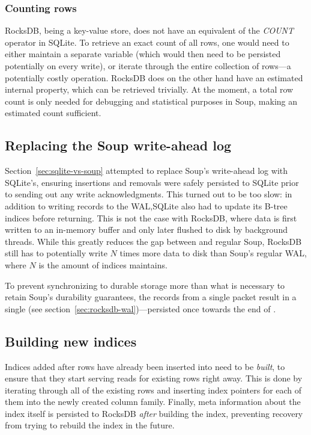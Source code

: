 \subsubsection{Counting rows}

RocksDB, being a key-value store, does not have an equivalent of the
\textit{COUNT} operator in SQLite. To retrieve an exact count of all rows, one
would need to either maintain a separate variable (which would then need to be
persisted potentially on every write), or iterate through the entire collection
of rows---a potentially costly operation. RocksDB does on the other hand have an
estimated internal property,  which can be
retrieved trivially. At the moment, a total row count is only needed for
debugging and statistical purposes in Soup, making an estimated count
sufficient.

\subsection{Replacing the Soup write-ahead log}

Section~\ref{sec:sqlite-vs-soup} attempted to replace Soup's write-ahead log
with SQLite's, ensuring insertions and removals were safely persisted to SQLite
prior to sending out any write acknowledgments. This turned out to be too slow:
in addition to writing records to the WAL,\@ SQLite also had to update its B-tree
indices before returning. This is not the case with RocksDB, where data is first
written to an in-memory buffer and only later flushed to disk by background
threads. While this greatly reduces the gap between  and
regular Soup, RocksDB still has to potentially write $ N  $ times more data to
disk than Soup's regular WAL, where $ N $ is the amount of indices
 maintains.

To prevent synchronizing to durable storage more than what is necessary to
retain Soup's durability guarantees, the records from a single packet result in
a single  (see section~\ref{sec:rocksdb-wal})---persisted once
towards the end of .


\subsection{Building new indices}

Indices added after rows have already been inserted into 
need to be \textit{built}, to ensure that they start serving reads for
existing rows right away. This is done by iterating through all of the existing
rows and inserting index pointers for each of them into the newly created column
family. Finally, meta information about the index itself is persisted to RocksDB
\textit{after} building the index, preventing recovery from trying to rebuild
the index in the future.

